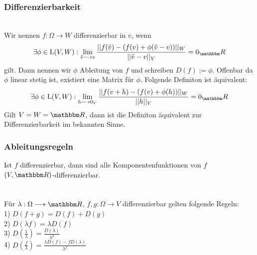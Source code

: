 \subsubsection*{Differenzierbarkeit}
 \\
Wir nennen \(f : \Omega \longrightarrow W\) differenzierbar in \(v\), wenn \[\exists \phi \in \text L(V,W): \lim_{\tilde v \longrightarrow v} \frac{||f(\tilde v) - (f(v) + \phi(\tilde v - v))||_W}{||\tilde v - v||_V} = 0_\R\]
gilt. Dann nennen wir \(\phi\) Ableitung von \(f\) und schreiben \(D(f) := \phi\). Offenbar da \(\phi\) linear stetig ist, existiert eine Matrix für \(\phi\). Folgende Definiton ist äquivalent: \[\exists \phi \in \text L(V,W): \lim_{h \longrightarrow 0_V} \frac{||f(v + h) - (f(v) + \phi(h))||_W}{||h||_V} = 0_\R\]
Gilt \(V = W = \R\), dann ist die Definiton äquivalent zur Differenzierbarkeit im bekannten Sinne.
\subsubsection*{Ableitungsregeln}
Ist \(f\) differenzierbar, dann sind alle Komponentenfunktionen von \(f\) \((V,\R)\)-differenzierbar. \\ \\
 \\
Für \(\lambda : \Omega \longrightarrow \R\), \(f,g : \Omega \longrightarrow V\) differenzierbar gelten folgende Regeln:\\
1) \(D(f+g) = D(f) + D(g)\) \\
2) \(D(\lambda f) = \lambda D(f)\) \\
3) \(D\left(\frac{1}{\lambda}\right) = \frac{D(\lambda)}{\lambda^2}\) \\
4) \(D\left(\frac{f}{\lambda}\right) = \frac{\lambda D(f) - fD(\lambda)}{\lambda^2}\) \pagebreak

